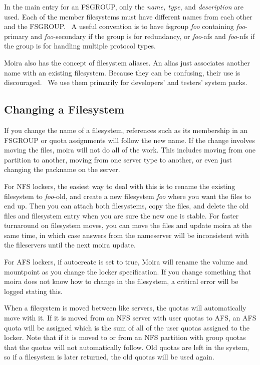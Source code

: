 \documentclass{book}
\begin{document}
In the main entry for an FSGROUP, only the {\em name, type}, and
{\em description} are used.  Each of the member filesystems must have
different names from each other and the FSGROUP.  \athena\ A useful
convention is to have fsgroup {\em foo} containing {\em foo}-primary and
{\em foo}-secondary if the group is for redundancy, or {\em foo}-afs and
{\em foo}-nfs if the group is for handling multiple protocol types.

Moira also has the concept of filesystem aliases.    An alias just associates another name with an existing
filesystem.  Because they can be confusing, their use is discouraged.
\athena\ We use them primarily for developers' and testers' system
packs.


\subsection{Changing a Filesystem}

If you change the name of a filesystem, references such as its
membership in an FSGROUP or quota assignments will follow the new
name.  If the change involves moving the files, moira will not do all
of the work.  This includes moving from one partition to another,
moving from one server type to another, or even just changing the
packname on the server.

For NFS lockers, the easiest way to deal with this is to rename the
existing filesystem to {\em foo}-old, and create a new filesystem {\em
foo} where you want the files to end up.  Then you can attach both
filesystems, copy the files, and delete the old files and filesystem
entry when you are sure the new one is stable.  For faster turnaround
on filesystem moves, you can move the files and update moira at the
same time, in which case answers from the nameserver will be
inconsistent with the fileservers until the next moira update.

For AFS lockers, if autocreate is set to true, Moira will rename the
volume and mountpoint as you change the locker specification.  If you
change something that moira does not know how to change in the
filesystem, a critical error will be logged stating this.

When a filesystem is moved between like servers, the quotas will
automatically move with it.  If it is moved from an NFS server with
user quotas to AFS, an AFS quota will be assigned which is the sum of
all of the user quotas assigned to the locker.  Note that if it is
moved to or from an NFS partition with group quotas that the quotas
will not automatically follow.  Old quotas are left in the system, so
if a filesystem is later returned, the old quotas will be used again.
\end{document}
